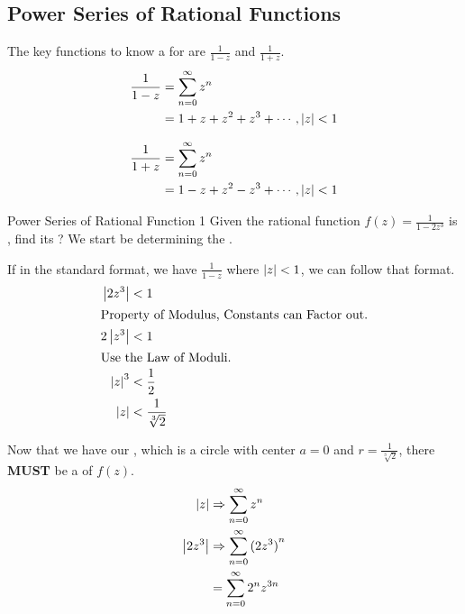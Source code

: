 \subsection{Power Series of Rational Functions}\label{subsec:Complex_Power_Series-Rational_Functions}
The key functions to know a  for are $\frac{1}{1-z}$ and $\frac{1}{1+z}$.
\begin{equation}\label{eq:Complex_Power_Series-1-z}
  \begin{aligned}
    \frac{1}{1-z} &= \sum_{n=0}^{\infty} z^{n} \\
    &= 1 + z + z^{2} + z^{3} + \cdots \, , \left\lvert z \right\rvert < 1
  \end{aligned}
\end{equation}

\begin{equation}\label{eq:Complex_Power_Series-1+z}
  \begin{aligned}
    \frac{1}{1+z} &= \sum_{n=0}^{\infty} z^{n} \\
    &= 1 - z + z^{2} - z^{3} + \cdots \, , \left\lvert z \right\rvert < 1
  \end{aligned}
\end{equation}

\begin{example}{Power Series of Rational Function 1}
  Given the rational function $f(z) = \frac{1}{1-2z^{3}}$ is , find its ?
  \tcblower{}
  We start be determining the .

  If in the standard format, we have $\frac{1}{1-z}$ where $\left\lvert z \right\rvert < 1$, we can follow that format.
  \begin{align*}
    \left\lvert 2z^{3} \right\rvert &< 1 \\
    \shortintertext{Property of Modulus, Constants can Factor out.}
    2 \left\lvert z^{3} \right\rvert &< 1 \\
    \shortintertext{Use the Law of Moduli.}
    {\ensuremath{\left\lvert z \right\rvert}}^{3} &< \frac{1}{2} \\
    \left\lvert z \right\rvert &< \frac{1}{\sqrt[3]{2}}
  \end{align*}

  Now that we have our , which is a circle with center $a=0$ and $r = \frac{1}{\sqrt[3]{2}}$, there \textbf{MUST} be a  of $f(z)$.
  \begin{align*}
    \left\lvert z \right\rvert &\Rightarrow \sum_{n=0}^{\infty} z^{n} \\
    \left\lvert 2z^{3} \right\rvert &\Rightarrow \sum_{n=0}^{\infty} {(2z^{3})}^{n} \\
                &= \sum_{n=0}^{\infty} 2^{n} z^{3n}
  \end{align*}
\end{example}

